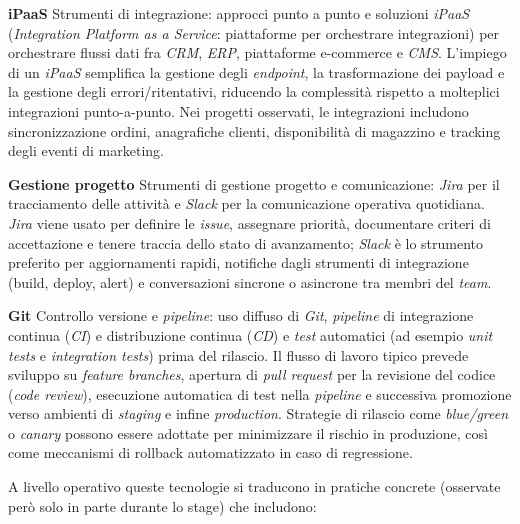 \medskip
\noindent\textbf{iPaaS}
Strumenti di integrazione: approcci punto a punto e soluzioni \emph{iPaaS} (\emph{Integration Platform as a Service}: piattaforme per orchestrare integrazioni) 
per orchestrare flussi dati fra \emph{CRM}, \emph{ERP}, piattaforme e-commerce e \emph{CMS}. L’impiego di un \emph{iPaaS} semplifica la gestione degli \emph{endpoint}, 
la trasformazione dei payload e la gestione degli errori/ritentativi, riducendo la complessità rispetto a molteplici integrazioni punto-a-punto. Nei progetti osservati, 
le integrazioni includono sincronizzazione ordini, anagrafiche clienti, disponibilità di magazzino e tracking degli eventi di marketing.

\medskip
\noindent\textbf{Gestione progetto}
Strumenti di gestione progetto e comunicazione: \emph{Jira} per il tracciamento delle attività e \emph{Slack} per la comunicazione operativa quotidiana. \emph{Jira} 
viene usato per definire le \emph{issue}, assegnare priorità, documentare criteri di accettazione e tenere traccia dello stato di avanzamento; \emph{Slack} 
è lo strumento preferito per aggiornamenti rapidi, notifiche dagli strumenti di integrazione (build, deploy, alert) e conversazioni sincrone o asincrone tra membri del \emph{team}.

\medskip
\noindent\textbf{Git}
Controllo versione e \emph{pipeline}: uso diffuso di \emph{Git}, \emph{pipeline} di integrazione continua (\emph{CI}) e distribuzione continua (\emph{CD}) e \emph{test} 
automatici (ad esempio \emph{unit tests} e \emph{integration tests}) prima del rilascio. Il flusso di lavoro tipico prevede sviluppo su \emph{feature branches}, 
apertura di \emph{pull request} per la revisione del codice (\emph{code review}), esecuzione automatica di test nella \emph{pipeline} e successiva promozione verso 
ambienti di \emph{staging} e infine \emph{production}. Strategie di rilascio come \emph{blue/green} o \emph{canary} possono essere adottate per minimizzare il 
rischio in produzione, così come meccanismi di rollback automatizzato in caso di regressione.

A livello operativo queste tecnologie si traducono in pratiche concrete (osservate però solo in parte durante lo stage) che includono:

